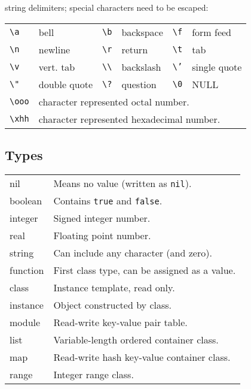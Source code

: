 string delimiters; special characters need to be escaped:\\
\setlength{\tabcolsep}{2mm}
\begin{tabular}{@{}llllll}
    \texttt{\textbackslash a} & bell & \texttt{\textbackslash b} & backspace & \texttt{\textbackslash f} & form feed \\
    \texttt{\textbackslash n} & newline & \texttt{\textbackslash r} & return & \texttt{\textbackslash t} & tab \\
    \texttt{\textbackslash v} & vert. tab & \texttt{\textbackslash\textbackslash} & backslash & \texttt{\textbackslash '} & single quote \\
    \texttt{\textbackslash "} & double quote & \texttt{\textbackslash ?} & question & \texttt{\textbackslash 0} & NULL \\
    \texttt{\textbackslash ooo} & \multicolumn{5}{l}{character represented octal number.} \\
    \texttt{\textbackslash xhh} & \multicolumn{5}{l}{character represented hexadecimal number.}
\end{tabular}

\subsection*{Types}
\begin{tabular}{@{}ll}
    \textsf{nil} & Means no value (written as \texttt{nil}). \\
    \textsf{boolean} & Contains \texttt{true} and \texttt{false}. \\
    \textsf{integer} & Signed integer \textsf{number}. \\
    \textsf{real} & Floating point \textsf{number}. \\
    \textsf{string} & Can include any character (and zero). \\
    \textsf{function} & First class type, can be assigned as a value. \\
    \textsf{class} & Instance template, read only. \\
    \textsf{instance} & Object constructed by class. \\
    \textsf{module} & Read-write key-value pair table. \\
    \textsf{list} & Variable-length ordered container class. \\
    \textsf{map} &  Read-write hash key-value container class. \\
    \textsf{range} & Integer range class. \\
\end{tabular}

